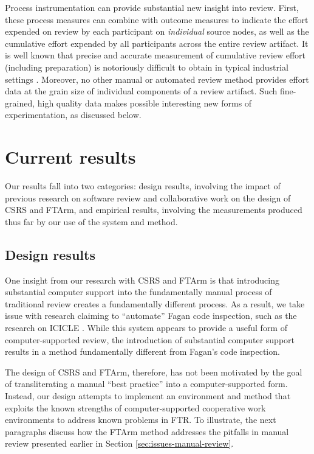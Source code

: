 Process instrumentation can provide substantial new insight into review.
First, these process measures can combine with outcome measures to indicate
the effort expended on review by each participant on {\em individual}
source nodes, as well as the cumulative effort expended by all participants
across the entire review artifact. It is well known that precise and
accurate measurement of cumulative review effort (including preparation) is
notoriously difficult to obtain in typical industrial settings
\cite{Freedman90}.  Moreover, no other manual or automated review method
provides effort data at the grain size of individual components of a review
artifact.  Such fine-grained, high quality data makes possible interesting
new forms of experimentation, as discussed below.


\section{Current results}
\label{sec:results}

Our results fall into two categories: design results, involving the impact
of previous research on software review and collaborative work on the
design of CSRS and FTArm, and empirical results, involving the measurements
produced thus far by our use of the system and method.

\subsection{Design results} 

One insight from our research with CSRS and FTArm is that introducing
substantial computer support into the fundamentally manual process of
traditional review creates a fundamentally different process.  As a result,
we take issue with research claiming to ``automate'' Fagan code inspection,
such as the research on ICICLE \cite{Brothers90}.  While this system
appears to provide a useful form of computer-supported review, the
introduction of substantial computer support results in a method
fundamentally different from Fagan's code inspection.

The design of CSRS and FTArm, therefore, has not been motivated by the goal
of transliterating a manual ``best practice'' into a computer-supported
form.  Instead, our design attempts to implement an environment and method
that exploits the known strengths of computer-supported cooperative work
environments to address known problems in FTR.  To illustrate, the next
paragraphs discuss how the FTArm method addresses the pitfalls in manual
review presented earlier in Section \ref{sec:issues-manual-review}.

